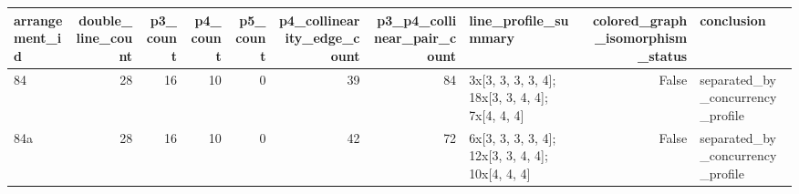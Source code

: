 \begin{tabular}{lrrrrrrlrl}
\toprule
arrangement_id & double_line_count & p3_count & p4_count & p5_count & p4_collinearity_edge_count & p3_p4_collinear_pair_count & line_profile_summary & colored_graph_isomorphism_status & conclusion \\
\midrule
84 & 28 & 16 & 10 & 0 & 39 & 84 & 3x[3, 3, 3, 3, 4]; 18x[3, 3, 4, 4]; 7x[4, 4, 4] & False & separated_by_concurrency_profile \\
84a & 28 & 16 & 10 & 0 & 42 & 72 & 6x[3, 3, 3, 3, 4]; 12x[3, 3, 4, 4]; 10x[4, 4, 4] & False & separated_by_concurrency_profile \\
\bottomrule
\end{tabular}

